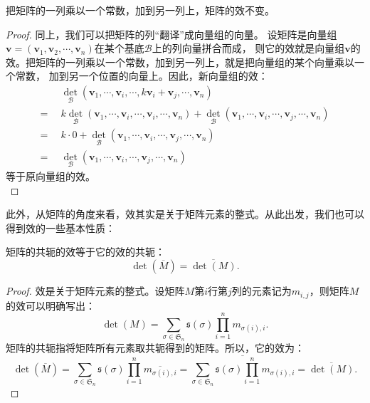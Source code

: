 \documentclass[12pt,UTF8,fontset=none]{ctexbook}
\begin{document}
\begin{pp}\label{pp:10_38}
    把矩阵的一列乘以一个常数，加到另一列上，矩阵的效不变。
\end{pp}
\begin{proof} %
    同上，我们可以把矩阵的列“翻译”成向量组的向量。
    设矩阵是向量组$\mathbf{v} = (\mathbf{v}_1, \mathbf{v}_2, \cdots , \mathbf{v}_n)$在某个基底$\mathcal{B}$上的列向量拼合而成，
    则它的效就是向量组$\mathbf{v}$的效。把矩阵的一列乘以一个常数，加到另一列上，就是把向量组的某个向量乘以一个常数，
    加到另一个位置的向量上。因此，新向量组的效：
    \begin{align*}
        & \,\,\,\det_\mathcal{B} (\mathbf{v}_1,  \cdots , \mathbf{v}_i, \cdots , k \mathbf{v}_i + \mathbf{v}_j, \cdots , \mathbf{v}_n)  \\
        =& \,\,\, k\det_\mathcal{B} (\mathbf{v}_1,  \cdots , \mathbf{v}_i, \cdots , \mathbf{v}_i, \cdots , \mathbf{v}_n) + \det_\mathcal{B} (\mathbf{v}_1,  \cdots , \mathbf{v}_i, \cdots , \mathbf{v}_j, \cdots , \mathbf{v}_n)  \\
        =& \,\,\, k\cdot 0 + \det_\mathcal{B} (\mathbf{v}_1,  \cdots , \mathbf{v}_i, \cdots , \mathbf{v}_j, \cdots , \mathbf{v}_n)  \\
        =& \,\,\, \det_\mathcal{B} (\mathbf{v}_1,  \cdots , \mathbf{v}_i, \cdots , \mathbf{v}_j, \cdots , \mathbf{v}_n)  
    \end{align*}
    等于原向量组的效。\\
\end{proof}

此外，从矩阵的角度来看，效其实是关于矩阵元素的整式。从此出发，我们也可以得到效的一些基本性质：
\begin{pp}\label{pp:10_34}
    矩阵的共轭的效等于它的效的共轭：
    $$ \det(\overline{M}) = \overline{\det(M)}.$$
\end{pp}
\begin{proof} %
    效是关于矩阵元素的整式。设矩阵$M$第$i$行第$j$列的元素记为$m_{i,j}$，则矩阵$M$的效可以明确写出：
    $$ \det (M) = \sum_{\sigma\in\mathfrak{S}_n} \mathfrak{s}(\sigma) \prod_{i=1}^n m_{\sigma(i),i}. $$
    矩阵的共轭指将矩阵所有元素取共轭得到的矩阵。所以，它的效为：
    $$ \det(\overline{M}) = \sum_{\sigma\in\mathfrak{S}_n} \mathfrak{s}(\sigma) \prod_{i=1}^n \overline{m_{\sigma(i),i}} = \overline{\sum_{\sigma\in\mathfrak{S}_n} \mathfrak{s}(\sigma) \prod_{i=1}^n m_{\sigma(i),i}} = \overline{\det(M)}. $$
\end{proof}
\end{document}
